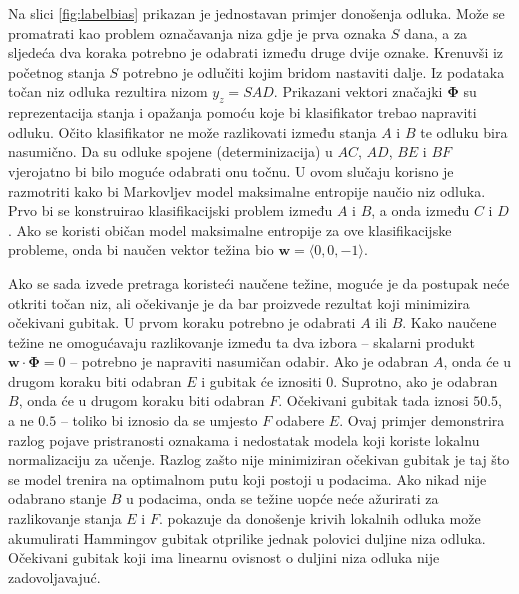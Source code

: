 Na slici \ref{fig:labelbias} prikazan je jednostavan primjer donošenja odluka.
Može se promatrati kao problem označavanja niza gdje je prva oznaka $S$ dana, a
za sljedeća dva koraka potrebno je odabrati između druge dvije oznake. Krenuvši
iz početnog stanja $S$ potrebno je odlučiti kojim bridom nastaviti dalje. Iz
podataka točan niz odluka rezultira nizom $y_z = SAD$. Prikazani vektori
značajki $\mathbf{\Phi}$ su reprezentacija stanja i opažanja pomoću koje bi
klasifikator trebao napraviti odluku. Očito klasifikator ne može razlikovati
između stanja $A$ i $B$ te odluku bira nasumično. Da su odluke spojene
(determinizacija) u $AC$, $AD$, $BE$ i $BF$ vjerojatno bi bilo moguće odabrati
onu točnu. U ovom slučaju korisno je razmotriti kako bi Markovljev model
maksimalne entropije naučio niz odluka. Prvo bi se konstruirao klasifikacijski
problem između $A$ i $B$, a onda između $C$ i $D$. Ako se koristi običan model
maksimalne entropije za ove klasifikacijske probleme, onda bi naučen vektor
težina bio $\mathbf{w} = \langle 0,0,-1 \rangle$.

Ako se sada izvede pretraga koristeći naučene težine, moguće je da postupak neće
otkriti točan niz, ali očekivanje je da bar proizvede rezultat koji minimizira
očekivani gubitak. U prvom koraku potrebno je odabrati $A$ ili $B$. Kako naučene
težine ne omogućavaju razlikovanje između ta dva izbora -- skalarni produkt
$\mathbf{w} \cdot \mathbf{\Phi} = 0$ -- potrebno je napraviti nasumičan odabir.
Ako je odabran $A$, onda će u drugom koraku biti odabran $E$ i gubitak će
iznositi 0. Suprotno, ako je odabran $B$, onda će u drugom koraku biti odabran
$F$. Očekivani gubitak tada iznosi $50.5$, a ne $0.5$ -- toliko bi iznosio da se
umjesto $F$ odabere $E$. Ovaj primjer demonstrira razlog pojave pristranosti
oznakama i nedostatak modela koji koriste lokalnu normalizaciju za učenje.
Razlog zašto nije minimiziran očekivan gubitak je taj što se model trenira na
optimalnom putu koji postoji u podacima. Ako nikad nije odabrano stanje $B$ u
podacima, onda se težine uopće neće ažurirati za razlikovanje stanja $E$ i $F$.
\citet{kaariainen2006lower} pokazuje da donošenje krivih lokalnih odluka može
akumulirati Hammingov gubitak otprilike jednak polovici duljine niza odluka.
Očekivani gubitak koji ima linearnu ovisnost o duljini niza odluka nije
zadovoljavajuć.

